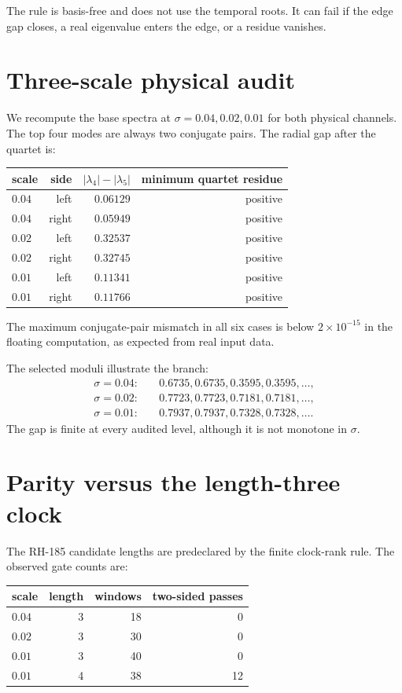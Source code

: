 \documentclass[12pt]{article}
\theoremstyle{remark}
\begin{document}
The rule is basis-free and does not use the temporal roots.  It can fail if
the edge gap closes, a real eigenvalue enters the edge, or a residue vanishes.

\section{Three-scale physical audit}

We recompute the base spectra at $\sigma=0.04,0.02,0.01$ for both physical
channels.  The top four modes are always two conjugate pairs.  The radial
gap after the quartet is:
\begin{center}
\begin{tabular}{lrrr}
\toprule
scale & side & $|\lambda_4|-|\lambda_5|$ & minimum quartet residue\\
\midrule
$0.04$ & left & $0.06129$ & positive\\
$0.04$ & right & $0.05949$ & positive\\
$0.02$ & left & $0.32537$ & positive\\
$0.02$ & right & $0.32745$ & positive\\
$0.01$ & left & $0.11341$ & positive\\
$0.01$ & right & $0.11766$ & positive\\
\bottomrule
\end{tabular}
\end{center}
The maximum conjugate-pair mismatch in all six cases is below
$2\times10^{-15}$ in the floating computation, as expected from real input
data.

The selected moduli illustrate the branch:
\begin{align}
\sigma=0.04:&\quad 0.6735,0.6735,0.3595,0.3595,\ldots,\\
\sigma=0.02:&\quad 0.7723,0.7723,0.7181,0.7181,\ldots,\\
\sigma=0.01:&\quad 0.7937,0.7937,0.7328,0.7328,\ldots.
\end{align}
The gap is finite at every audited level, although it is not monotone in
$\sigma$.

\section{Parity versus the length-three clock}

The RH-185 candidate lengths are predeclared by the finite clock-rank rule.
The observed gate counts are:
\begin{center}
\begin{tabular}{lrrr}
\toprule
scale & length & windows & two-sided passes\\
\midrule
$0.04$ & 3 & 18 & 0\\
$0.02$ & 3 & 30 & 0\\
$0.01$ & 3 & 40 & 0\\
$0.01$ & 4 & 38 & 12\\
\bottomrule
\end{tabular}
\end{center}
\end{document}
